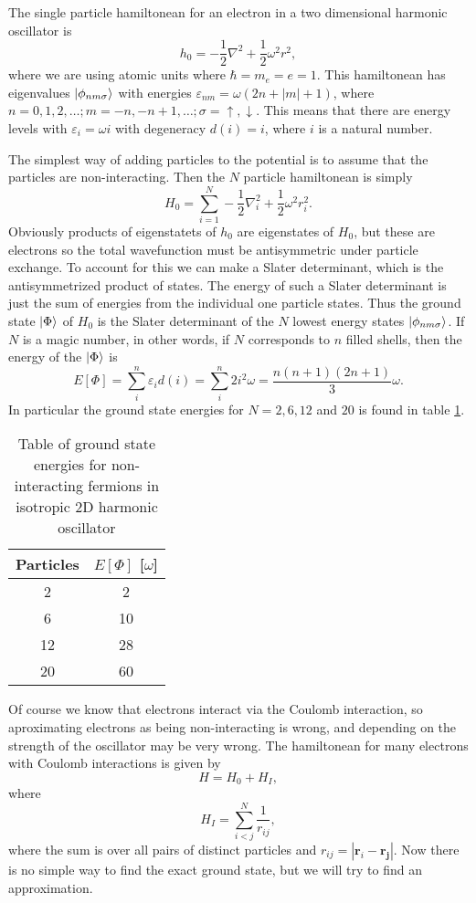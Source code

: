 \documentclass[a4paper,english,12pt]{article}
\newcommand{\bb}[1]{\boldsymbol{#1}}
\newcommand{\be}{\begin{equation}}
\newcommand{\ee}{\end{equation}}
\newcommand{\f}{\frac}
\renewcommand{\epsilon}{\varepsilon}
\begin{document}
The single particle hamiltonean for an electron in a two dimensional harmonic oscillator is
\[
h_0 = -\f{1}{2}\nabla^2 + \f{1}{2}\omega^2 r^2,
\]
where we are using atomic units where $\hbar = m_e = e = 1$.
This hamiltonean has eigenvalues
\(\ket{\phi_{nm\sigma}}\) with energies \(\epsilon_{nm} = \omega(2n+|m|+1)\), where $n = 0,1,2,\ldots; m = -n,-n+1,\ldots; \sigma = \uparrow,\downarrow$.
This means that there are energy levels with \(\epsilon_i = \omega i\) with degeneracy \(d(i) = i\), where $i$ is a natural number.


The simplest way of adding particles to the potential is to assume that the particles are non-interacting. Then the $N$ particle hamiltonean is simply
\be
H_0 = \sum_{i=1}^N -\f{1}{2}\nabla_i^2 + \f{1}{2}\omega^2 r_i^2.
\ee
Obviously products of eigenstatets of $h_0$ are eigenstates of $H_0$, but these are electrons so the total wavefunction must be antisymmetric under particle exchange.
To account for this we can make a Slater determinant, which is the antisymmetrized product of states. The energy of such a Slater determinant is just the sum of energies from the
individual one particle states. Thus the ground state $\Ket{\Phi}$ of $H_0$ is the Slater determinant of the $N$ lowest energy states $\ket{\phi_{nm\sigma}}$. If $N$ is a magic number, in other words, if $N$ corresponds to $n$ filled shells, then the energy of the $\Ket{\Phi}$ is
\be\label{eqH0}
E[\Phi] = \sum_i^n\epsilon_id(i) = \sum_i^n2i^2\omega = \f{n(n+1)(2n+1)}{3}\omega.
\ee
In particular the ground state energies for $N = 2,6,12$ and $20$ is found in table \ref{tab0}.


\begin{table}
  \caption{Table of ground state energies for non-interacting fermions in isotropic 2D harmonic oscillator}\label{tab0}
  \begin{center}
    \begin{tabular}{*{2}{c}}
      Particles &  $E[\Phi]$ [$\omega$] \\
      \hline
      2&2\\
      6&10\\
      12&28\\
      20&60\\
    \end{tabular}
  \end{center}
\end{table}



Of course we know that electrons interact via the Coulomb interaction, so aproximating electrons as being non-interacting is wrong,
and depending on the strength of the oscillator may be very wrong.
The hamiltonean for many electrons with Coulomb interactions is given by
\be
H = H_0 + H_I,
\ee
where
\be\label{eqHi}
H_I = \sum_{i<j}^N\f{1}{r_{ij}},
\ee
where the sum is over all pairs of distinct particles and $r_{ij} = |\bb{r}_i-\bb{r_j}|$.
Now there is no simple way to find the exact ground state, but we will try to find an approximation.
\end{document}
